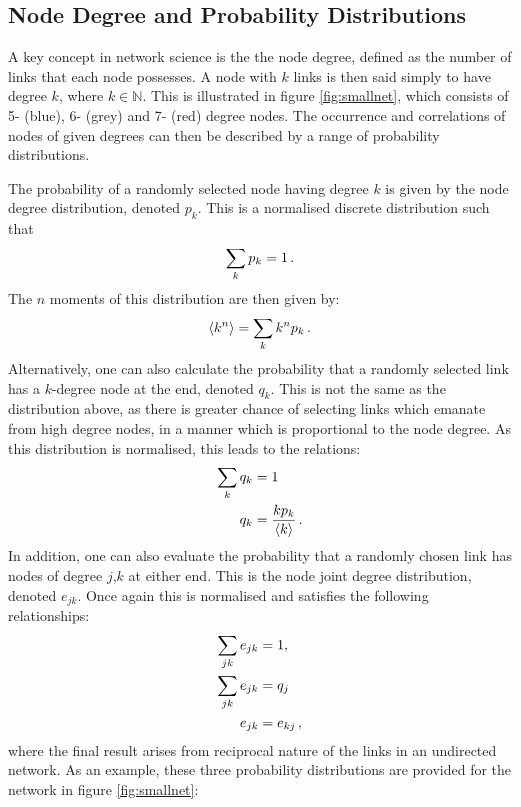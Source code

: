\subsection{Node Degree and Probability Distributions} 

A key concept in network science is the the node degree, defined as the number of links that each node possesses.
A node with $k$ links is then said simply to have degree $k$, where $k\in\mathbb{N}$.
This is illustrated in figure \ref{fig:smallnet}, which consists of 5\-- (blue), 6\-- (grey) and 7\-- (red) degree nodes.
The occurrence and correlations of nodes of given degrees can then be described by a range of probability distributions.

The probability of a randomly selected node having degree $k$ is given by the node degree distribution, denoted $p_k$.
This is a normalised discrete distribution such that
\begin{equation}
	\label{eq:pknorm}
	\sum\limits_k p_k = 1 \,.
\end{equation}
The $n$\th{} moments of this distribution are then given by:
\begin{equation}
	\label{eq:pkmoment}
	\langle k^{n} \rangle = \sum\limits_k k^np_k \,.
\end{equation}
Alternatively, one can also calculate the probability that a randomly selected link has a $k$\--degree node at the end, denoted $q_k$.
This is not the same as the distribution above, as there is greater chance of selecting links which emanate from high degree nodes, in a manner which is proportional to the node degree.
As this distribution is normalised, this leads to the relations:
\begin{align}
	\sum\limits_k q_k &= 1 \label{eq:qknorm} \\
	q_k &= \frac{kp_k}{\langle k \rangle} \label{eq:qkpk} \,.
\end{align}
In addition, one can also evaluate the probability that a randomly chosen link has nodes of degree $j$,$k$ at either end.
This is the node joint degree distribution, denoted $e_{jk}$. 
Once again this is normalised and satisfies the following relationships:
\begin{align}
	\sum\limits_{jk} e_{jk} &= 1, \label{eq:ejknorm} \\
	\sum\limits_{jk} e_{jk} &= q_j \label{eq:ejkqk} \\
	e_{jk} &= e_{kj} \label{eq:ejkekj} \,,
\end{align}
where the final result arises from reciprocal nature of the links in an undirected network.
As an example, these three probability distributions are provided for the network in figure \ref{fig:smallnet}:

